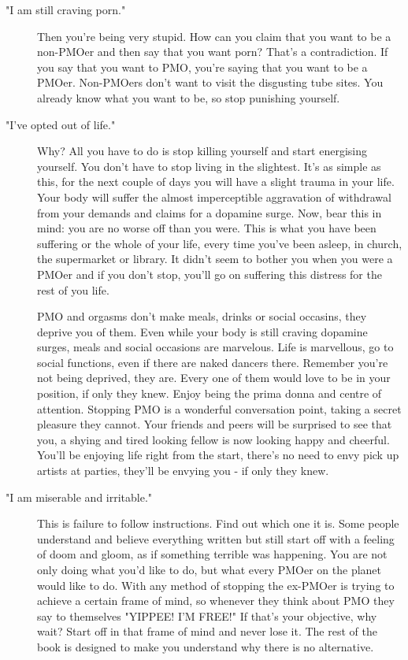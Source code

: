 \documentclass[easypeasy.tex]{subfiles}
\begin{document}
\begin{description}
\begin{description}
      \item ["I am still craving porn."] Then you're being very stupid. How can you claim that you want to be a non-PMOer and then say that you want porn? That's a contradiction. If you say that you want to PMO, you're saying that you want to be a PMOer. Non-PMOers don't want to visit the disgusting tube sites. You already know what you want to be, so stop punishing yourself.

      \item ["I've opted out of life."] Why? All you have to do is stop killing yourself and start energising yourself. You don't have to stop living in the slightest. It's as simple as this, for the next couple of days you will have a slight trauma in your life. Your body will suffer the almost imperceptible aggravation of withdrawal from your demands and claims for a dopamine surge. Now, bear this in mind: you are no worse off than you were. This is what you have been suffering or the whole of your life, every time you've been asleep, in church, the supermarket or library. It didn't seem to bother you when you were a PMOer and if you don't stop, you'll go on suffering this distress for the rest of you life.

      PMO and orgasms don't make meals, drinks or social occasins, they deprive you of them. Even while your body is still craving dopamine surges, meals and social occasions are marvelous. Life is marvellous, go to social functions, even if there are naked dancers there. Remember you're not being deprived, they are. Every one of them would love to be in your position, if only they knew. Enjoy being the prima donna and centre of attention. Stopping PMO is a wonderful conversation point, taking a secret pleasure they cannot. Your friends and peers will be surprised to see that you, a shying and tired looking fellow is now looking happy and cheerful. You'll be enjoying life right from the start, there's no need to envy pick up artists at parties, they'll be envying you - if only they knew.

     \item ["I am miserable and irritable."] This is failure to follow instructions. Find out which one it is. Some people understand and believe everything written but still start off with a feeling of doom and gloom, as if something terrible was happening. You are not only doing what you'd like to do, but what every PMOer on the planet would like to do. With any method of stopping the ex-PMOer is trying to achieve a certain frame of mind, so whenever they think about PMO they say to themselves "YIPPEE! I'M FREE!" If that's your objective, why wait? Start off in that frame of mind and never lose it. The rest of the book is designed to make you understand why there is no alternative.

\end{description}
\end{description}
\end{document}
